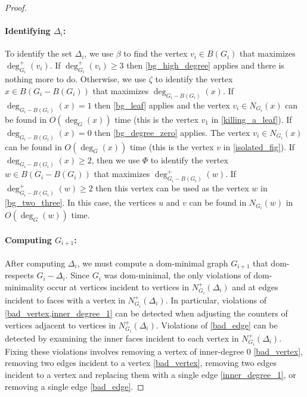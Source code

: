 \documentclass[11pt]{article}
\newcommand{\pat}[1]{\textcolor{red}{PM: #1}}
\newcommand{\hussein}[1]{\textcolor{purple}{HH: #1}}
\theoremstyle{definition}
\begin{document}
\begin{proof}
    \paragraph{Identifying $\Delta_i$:}
    To identify the set $\Delta_i$, we use $\beta$ to find the vertex $v_i\in B(G_i)$ that maximizes $\deg^+_{G_i}(v_i)$.  If $\deg^+_{G_i}(v_i)\ge 3$ then \cref{bg_high_degree} applies and there is nothing more to do.   Otherwise, we use $\zeta$ to identify the vertex $x\in B(G_i-B(G_i))$ that maximizes $\deg_{G_i-B(G_i)}(x)$.  If $\deg_{G_i-B(G_i)}(x)=1$ then \cref{bg_leaf} applies and the vertex $v_i\in N_{G_i}(x)$ can be found in $O(\deg_G(x))$ time (this is the vertex $v_1$ in \cref{killing_a_leaf}).  If $\deg_{G_i-B(G_i)}(x)=0$ then \cref{bg_degree_zero} applies.  The vertex $v_i\in N_{G_i}(x)$ can be found in $O(\deg_G(x))$ time (this is the vertex $v$ in \cref{isolated_fig}).  If $\deg_{G_i-B(G_i)}(x)\ge 2$, then we use $\Phi$ to identify the vertex $w\in B(G_i-B(G_i))$ that maximizes $\deg^+_{G_i-B(G_i)}(w)$.  If  $\deg^+_{G_i-B(G_i)}(w)\ge 2$ then this vertex can be used as the vertex $w$ in \cref{bg_two_three}.  In this case, the vertices $u$ and $v$ can be found in $N_{G_i}(w)$ in $O(\deg_G(w))$ time.

\paragraph{Computing $G_{i+1}$:}  After computing $\Delta_i$, we must compute a dom-minimal graph $G_{i+1}$ that dom-respects $G_i-\Delta_i$.  Since $G_i$ was dom-minimal, the only violations of dom-minimality occur at vertices incident to vertices in $N^+_{G_i}(\Delta_i)$ and at edges incident to faces with a vertex in $N^+_{G_i}(\Delta_i)$.  In particular, violations of \cref{bad_vertex,inner_degree_1} can be detected when adjusting the counters of vertices adjacent to vertices in $N^+_{G_i}(\Delta_i)$.  Violations of \cref{bad_edge} can be detected by examining the inner faces incident to each vertex in $N^+_{G_i}(\Delta_i)$.  Fixing these violations involves removing a vertex of inner-degree $0$ \cref{bad_vertex}, removing two edges incident to a vertex \cref{bad_vertex}, removing two edges incident to a vertex and replacing them with a single edge \cref{inner_degree_1}, or removing a single edge \cref{bad_edge}.



\end{proof}
\end{document}
